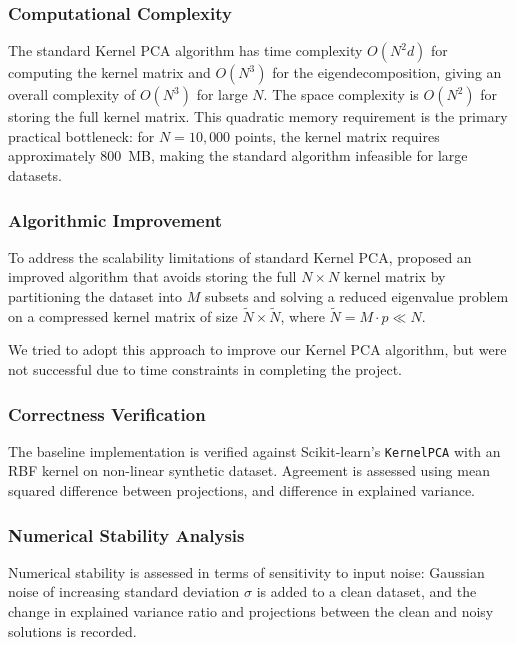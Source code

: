 \subsubsection*{Computational Complexity}

The standard Kernel PCA algorithm has time complexity $O(N^2 d)$ for computing
the kernel matrix and $O(N^3)$ for the eigendecomposition, giving an overall
complexity of $O(N^3)$ for large $N$. The space complexity is $O(N^2)$ for
storing the full kernel matrix. This quadratic memory requirement is the
primary practical bottleneck: for $N = 10{,}000$ points, the kernel matrix
requires approximately 800~MB, making the standard algorithm infeasible for
large datasets.

\subsubsection*{Algorithmic Improvement}

To address the scalability limitations of standard Kernel PCA,
\citet{zheng2005improved} proposed an improved algorithm that avoids storing
the full $N \times N$ kernel matrix by partitioning the dataset into $M$
subsets and solving a reduced eigenvalue problem on a compressed kernel matrix
of size $\tilde{N} \times \tilde{N}$, where $\tilde{N} = M \cdot p \ll N$.

We tried to adopt this approach to improve our Kernel PCA algorithm, but were not successful due to time constraints in completing the project. 

\subsubsection*{Correctness Verification}

The baseline implementation is verified against Scikit-learn's \texttt{KernelPCA} with an RBF kernel on non-linear synthetic dataset. Agreement is assessed using mean squared difference between projections, and difference in explained variance.

\subsubsection*{Numerical Stability Analysis}

Numerical stability is assessed in terms of sensitivity to input noise: Gaussian noise of increasing standard deviation $\sigma$ is
added to a clean dataset, and the change in explained variance ratio and projections between the clean and noisy solutions is recorded. 

